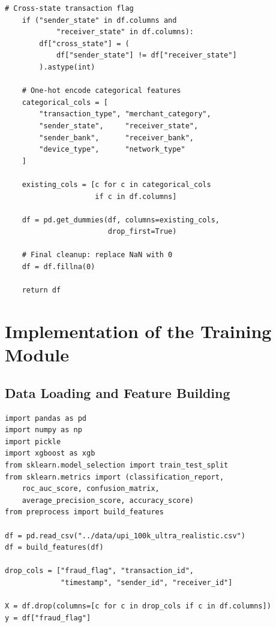 \begin{lstlisting}[caption={Stages 6-8 -- Cross-state flag, encoding, cleanup}, label={lst:stages6_8}]
    # Cross-state transaction flag
    if ("sender_state" in df.columns and
            "receiver_state" in df.columns):
        df["cross_state"] = (
            df["sender_state"] != df["receiver_state"]
        ).astype(int)

    # One-hot encode categorical features
    categorical_cols = [
        "transaction_type", "merchant_category",
        "sender_state",     "receiver_state",
        "sender_bank",      "receiver_bank",
        "device_type",      "network_type"
    ]

    existing_cols = [c for c in categorical_cols
                     if c in df.columns]

    df = pd.get_dummies(df, columns=existing_cols,
                        drop_first=True)

    # Final cleanup: replace NaN with 0
    df = df.fillna(0)

    return df
\end{lstlisting}

\section{Implementation of the Training Module}

\subsection{Data Loading and Feature Building}

\begin{lstlisting}[caption={Data loading and feature building in train.py}, label={lst:trainload}]
import pandas as pd
import numpy as np
import pickle
import xgboost as xgb
from sklearn.model_selection import train_test_split
from sklearn.metrics import (classification_report,
    roc_auc_score, confusion_matrix,
    average_precision_score, accuracy_score)
from preprocess import build_features

df = pd.read_csv("../data/upi_100k_ultra_realistic.csv")
df = build_features(df)

drop_cols = ["fraud_flag", "transaction_id",
             "timestamp", "sender_id", "receiver_id"]

X = df.drop(columns=[c for c in drop_cols if c in df.columns])
y = df["fraud_flag"]
\end{lstlisting}

